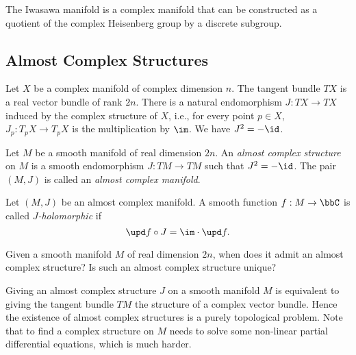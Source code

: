     \begin{example}\label{eg:Iwasawa_manifold}
        The Iwasawa manifold is a complex manifold that can be constructed as a quotient of the complex Heisenberg group by a discrete subgroup.
    \end{example}

\subsection{Almost Complex Structures}

    Let \(X\) be a complex manifold of complex dimension \(n\).
    The tangent bundle \(TX\) is a real vector bundle of rank \(2n\).
    There is a natural endomorphism \(J: TX\to TX\) induced by the complex structure of \(X\), i.e., for every point \(p\in X\), \(J_p: T_pX\to T_pX\) is the multiplication by \(\im\).
    We have \(J^2 = -\id\).

    \begin{definition}\label{def:almost_complex_structure}
        Let \(M\) be a smooth manifold of real dimension \(2n\).
        An \emph{almost complex structure} on \(M\) is a smooth endomorphism \(J: TM\to TM\) such that \(J^2 = -\id\).
        The pair \((M,J)\) is called an \emph{almost complex manifold}.
    \end{definition}

    \begin{definition}\label{def:J_holomorphic_function}
        Let \((M,J)\) be an almost complex manifold.
        A smooth function \(f: M\to \bbC\) is called \emph{\(J\)-holomorphic} if
        \[ \upd f \circ J = \im \cdot \upd f. \]
    \end{definition}

    \begin{question}\label{qs:existence_of_almost_complex_structure}
        Given a smooth manifold \(M\) of real dimension \(2n\), when does it admit an almost complex structure?
        Is such an almost complex structure unique?
    \end{question}

    Giving an almost complex structure \(J\) on a smooth manifold \(M\) is equivalent to giving the tangent bundle \(TM\) the structure of a complex vector bundle.
    Hence the existence of almost complex structures is a purely topological problem.
    Note that to find a complex structure on \(M\) needs to solve some non-linear partial differential equations, which is much harder.

